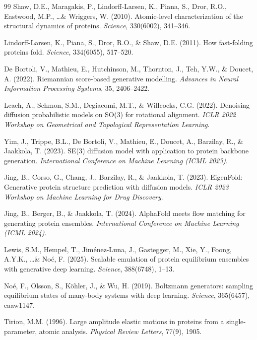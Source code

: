 \documentclass[11pt,a4paper]{article}
\begin{document}
\begin{thebibliography}{99}
Shaw, D.E., Maragakis, P., Lindorff-Larsen, K., Piana, S., Dror, R.O., Eastwood, M.P., \ldots \& Wriggers, W. (2010).
Atomic-level characterization of the structural dynamics of proteins.
\textit{Science}, 330(6002), 341--346.

Lindorff-Larsen, K., Piana, S., Dror, R.O., \& Shaw, D.E. (2011).
How fast-folding proteins fold.
\textit{Science}, 334(6055), 517--520.

De Bortoli, V., Mathieu, E., Hutchinson, M., Thornton, J., Teh, Y.W., \& Doucet, A. (2022).
Riemannian score-based generative modelling.
\textit{Advances in Neural Information Processing Systems}, 35, 2406--2422.

Leach, A., Schmon, S.M., Degiacomi, M.T., \& Willcocks, C.G. (2022).
Denoising diffusion probabilistic models on SO(3) for rotational alignment.
\textit{ICLR 2022 Workshop on Geometrical and Topological Representation Learning}.

Yim, J., Trippe, B.L., De Bortoli, V., Mathieu, E., Doucet, A., Barzilay, R., \& Jaakkola, T. (2023).
SE(3) diffusion model with application to protein backbone generation.
\textit{International Conference on Machine Learning (ICML 2023)}.

Jing, B., Corso, G., Chang, J., Barzilay, R., \& Jaakkola, T. (2023).
EigenFold: Generative protein structure prediction with diffusion models.
\textit{ICLR 2023 Workshop on Machine Learning for Drug Discovery}.

Jing, B., Berger, B., \& Jaakkola, T. (2024).
AlphaFold meets flow matching for generating protein ensembles.
\textit{International Conference on Machine Learning (ICML 2024)}.

Lewis, S.M., Hempel, T., Jim\'{e}nez-Luna, J., Gastegger, M., Xie, Y., Foong, A.Y.K., \ldots \& No\'{e}, F. (2025).
Scalable emulation of protein equilibrium ensembles with generative deep learning.
\textit{Science}, 388(6748), 1--13.

No\'{e}, F., Olsson, S., K\"{o}hler, J., \& Wu, H. (2019).
Boltzmann generators: sampling equilibrium states of many-body systems with deep learning.
\textit{Science}, 365(6457), eaaw1147.

Tirion, M.M. (1996).
Large amplitude elastic motions in proteins from a single-parameter, atomic analysis.
\textit{Physical Review Letters}, 77(9), 1905.


\end{thebibliography}
\end{document}
